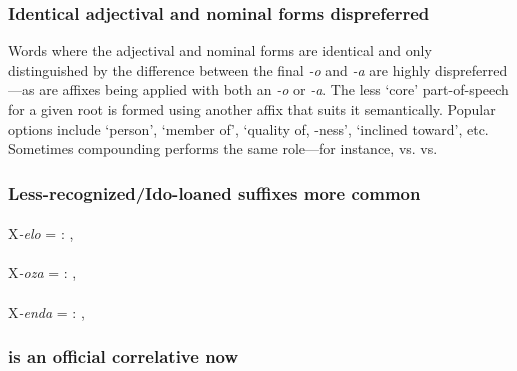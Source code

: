\ex
{} \til{} 
\xe

\subsubsection{Identical adjectival and nominal forms dispreferred}

Words where the adjectival and nominal forms are identical and only distinguished by the difference between the final \textit{-o} and \textit{-a} are highly dispreferred---as are affixes being applied with both an \textit{-o} or \textit{-a}. The less `core' part-of-speech for a given root is formed using another affix that suits it semantically. Popular options include  `person',  `member of',  `quality of, -ness',  `inclined toward', etc. Sometimes compounding performs the same role---for instance,   vs.   vs.  

\subsubsection{Less-recognized/Ido-loaned suffixes more common}

\paragraph{}

X\textit{-elo} = :  ,  

\paragraph{} 

X\textit{-oza} = :  ,  

\paragraph{}

X\textit{-enda} = :  ,  

\subsubsection{ is an official correlative now}

